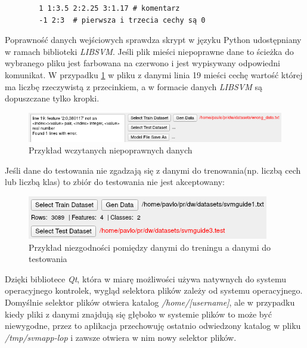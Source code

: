 \documentclass[paper=a4, fontsize=11pt]{scrartcl} %
\numberwithin{equation}{section} %
\numberwithin{figure}{section} %
\begin{document}
    \begin{verbatim}
        1 1:3.5 2:2.25 3:1.17 # komentarz
        -1 2:3  # pierwsza i trzecia cechy są 0
    \end{verbatim}

    \par Poprawność danych wejściowych sprawdza skrypt w języku Python udostępniany w ramach
    biblioteki \textit{LIBSVM}. Jeśli plik mieści niepoprawne dane to ścieżka do wybranego
    pliku jest farbowana na czerwono i jest wypisywany odpowiedni komunikat. W przypadku
    \ref{fig:files_example1} w pliku z danymi linia 19 mieści cechę wartość której ma liczbę
    rzeczywistą z przecinkiem, a w formacie danych \textit{LIBSVM} są dopuszczane tylko kropki.

    \begin{figure}[H]
        \begin{center}
            \includegraphics[scale=0.8]{./img/svm_app_mainw_filehandler_ex_wrong.png}
            \caption{Przykład wczytanych niepoprawnych danych}
            \label{fig:files_example1}
        \end{center}
    \end{figure}

    \par Jeśli dane do testowania nie zgadzają się z danymi do trenowania(np. liczbą cech lub
    liczbą klas) to zbiór do testowania nie jest akceptowany: 

    \begin{figure}[H]
        \begin{center}
            \includegraphics[scale=1.0]{./img/svm_app_mainw_filehandler_ex_wrong2.png}
            \caption{Przykład niezgodności pomiędzy danymi do treningu a danymi do testowania}
            \label{fig:files_example2}
        \end{center}
    \end{figure}

    \par Dzięki bibliotece \textit{Qt}, która w miarę możliwości używa natywnych do systemu
    operacyjnego kontrolek, wygląd selektora plików zależy od systemu operacyjnego. Domyślnie
    selektor plików otwiera katalog \textit{/home/[username]}, ale w przypadku kiedy pliki z
    danymi znajdują się głęboko w systemie plików to może być niewygodne, przez to aplikacja
    przechowuję ostatnio odwiedzony katalog w pliku \textit{/tmp/svmapp-lop} i zawsze otwiera w
    nim nowy selektor plików.
\end{document}

